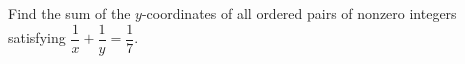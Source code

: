 Find the sum of the $y$-coordinates of all ordered pairs of nonzero integers satisfying $\dfrac{1}{x}+\dfrac{1}{y}=\dfrac{1}{7}$.
